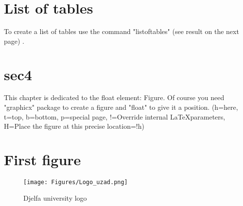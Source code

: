 \section{List of tables}
To create a list of tables use the command "listoftables" (see result on the next page) .
\listoftables
\newpage

\section{sec4}
This chapter is dedicated to the float element: Figure. Of course you need "graphicx" package to create a figure and "float" to give it a position.  
(h=here, t=top, b=bottom, p=special page, !=Override internal \LaTeX parameters, H=Place the figure at this precise location=!h)
\section{First figure}
\begin{figure}[H]
	\centering
	\texttt{[image: Figures/Logo\_uzad.png]}
	\caption{Djelfa university logo}
\end{figure}
